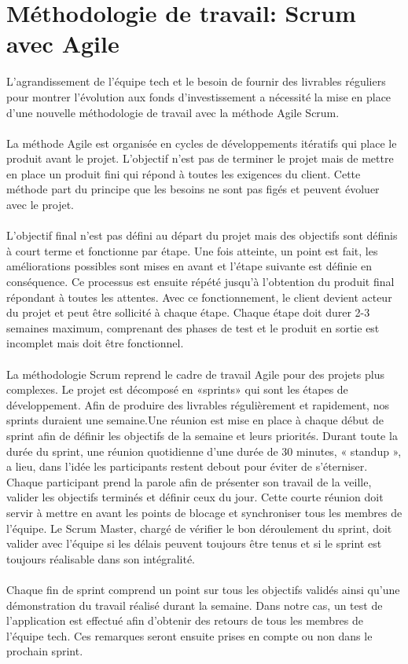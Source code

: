 \section{Méthodologie de travail: Scrum avec Agile}
L’agrandissement de l’équipe tech et le besoin de fournir des livrables réguliers pour montrer l’évolution aux fonds d’investissement a nécessité la mise en place d’une nouvelle méthodologie de travail avec la méthode Agile Scrum.\\ \\ La méthode Agile est organisée en cycles de développements itératifs qui place le produit avant le projet. L’objectif n’est pas de terminer le projet mais de mettre en place un produit fini qui répond à toutes les exigences du client. Cette méthode part du principe que les besoins ne sont pas figés et peuvent évoluer avec le projet.\\ \\L’objectif final n’est pas défini au départ du projet mais des objectifs sont définis à court terme et fonctionne par étape. Une fois atteinte, un point est fait, les améliorations possibles sont mises en avant et l’étape suivante est définie en conséquence. Ce processus est ensuite répété jusqu’à l’obtention du produit final répondant à toutes les attentes. Avec ce fonctionnement, le client devient acteur du projet et peut être sollicité à chaque étape. Chaque étape doit durer 2-3 semaines maximum, comprenant des phases de test et le produit en sortie est incomplet mais doit être fonctionnel.\\ \\ La méthodologie Scrum reprend le cadre de travail Agile pour des projets plus complexes. Le projet est décomposé en «sprints» qui sont les étapes de développement. Afin de produire des livrables régulièrement et rapidement, nos sprints duraient une semaine.Une réunion est mise en place à chaque début de sprint afin de définir les objectifs de la semaine et leurs priorités. Durant toute la durée du sprint, une réunion quotidienne d’une durée de 30 minutes, « standup », a lieu, dans l’idée les participants restent debout pour éviter de s’éterniser. Chaque participant prend la parole afin de présenter son travail de la veille, valider les objectifs terminés et définir ceux du jour. Cette courte réunion doit servir à mettre en avant les points de blocage et synchroniser tous les membres de l’équipe. Le Scrum Master, chargé de vérifier le bon déroulement du sprint, doit valider avec l’équipe si les délais peuvent toujours être tenus et si le sprint est toujours réalisable dans son intégralité.\\ \\
Chaque fin de sprint comprend un point sur tous les objectifs validés ainsi qu’une démonstration du travail réalisé durant la semaine. Dans notre cas, un test de l’application est effectué afin d’obtenir des retours de tous les membres de l’équipe tech. Ces remarques seront ensuite prises en compte ou non dans le prochain sprint.
